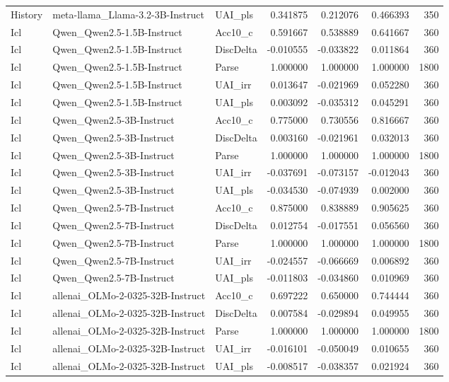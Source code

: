 \begin{tabular}{lllrrrr}
History & meta-llama_Llama-3.2-3B-Instruct & UAI_pls & 0.341875 & 0.212076 & 0.466393 & 350 \\
Icl & Qwen_Qwen2.5-1.5B-Instruct & Acc10_c & 0.591667 & 0.538889 & 0.641667 & 360 \\
Icl & Qwen_Qwen2.5-1.5B-Instruct & DiscDelta & -0.010555 & -0.033822 & 0.011864 & 360 \\
Icl & Qwen_Qwen2.5-1.5B-Instruct & Parse & 1.000000 & 1.000000 & 1.000000 & 1800 \\
Icl & Qwen_Qwen2.5-1.5B-Instruct & UAI_irr & 0.013647 & -0.021969 & 0.052280 & 360 \\
Icl & Qwen_Qwen2.5-1.5B-Instruct & UAI_pls & 0.003092 & -0.035312 & 0.045291 & 360 \\
Icl & Qwen_Qwen2.5-3B-Instruct & Acc10_c & 0.775000 & 0.730556 & 0.816667 & 360 \\
Icl & Qwen_Qwen2.5-3B-Instruct & DiscDelta & 0.003160 & -0.021961 & 0.032013 & 360 \\
Icl & Qwen_Qwen2.5-3B-Instruct & Parse & 1.000000 & 1.000000 & 1.000000 & 1800 \\
Icl & Qwen_Qwen2.5-3B-Instruct & UAI_irr & -0.037691 & -0.073157 & -0.012043 & 360 \\
Icl & Qwen_Qwen2.5-3B-Instruct & UAI_pls & -0.034530 & -0.074939 & 0.002000 & 360 \\
Icl & Qwen_Qwen2.5-7B-Instruct & Acc10_c & 0.875000 & 0.838889 & 0.905625 & 360 \\
Icl & Qwen_Qwen2.5-7B-Instruct & DiscDelta & 0.012754 & -0.017551 & 0.056560 & 360 \\
Icl & Qwen_Qwen2.5-7B-Instruct & Parse & 1.000000 & 1.000000 & 1.000000 & 1800 \\
Icl & Qwen_Qwen2.5-7B-Instruct & UAI_irr & -0.024557 & -0.066669 & 0.006892 & 360 \\
Icl & Qwen_Qwen2.5-7B-Instruct & UAI_pls & -0.011803 & -0.034860 & 0.010969 & 360 \\
Icl & allenai_OLMo-2-0325-32B-Instruct & Acc10_c & 0.697222 & 0.650000 & 0.744444 & 360 \\
Icl & allenai_OLMo-2-0325-32B-Instruct & DiscDelta & 0.007584 & -0.029894 & 0.049955 & 360 \\
Icl & allenai_OLMo-2-0325-32B-Instruct & Parse & 1.000000 & 1.000000 & 1.000000 & 1800 \\
Icl & allenai_OLMo-2-0325-32B-Instruct & UAI_irr & -0.016101 & -0.050049 & 0.010655 & 360 \\
Icl & allenai_OLMo-2-0325-32B-Instruct & UAI_pls & -0.008517 & -0.038357 & 0.021924 & 360 \\

\end{tabular}
